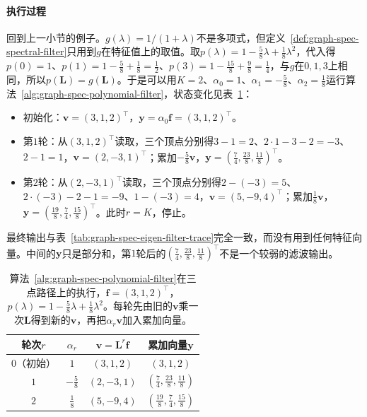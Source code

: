 \paragraph{执行过程}
回到上一小节的例子。$g(\lambda)=1/(1+\lambda)$不是多项式，但定义~\ref{def:graph-spec-spectral-filter}只用到$g$在特征值上的取值。取$p(\lambda)=1-\tfrac58\lambda+\tfrac18\lambda^2$，代入得$p(0)=1$、$p(1)=1-\tfrac58+\tfrac18=\tfrac12$、$p(3)=1-\tfrac{15}8+\tfrac98=\tfrac14$，与$g$在$0,1,3$上相同，所以$p(\bm L)=g(\bm L)$。于是可以用$K=2$、$\alpha_0=1$、$\alpha_1=-\tfrac58$、$\alpha_2=\tfrac18$运行算法~\ref{alg:graph-spec-polynomial-filter}，状态变化见表~\ref{tab:graph-spec-poly-filter-trace}：
\begin{itemize}
  \item 初始化：$\bm v=(3,1,2)^{\top}$，$\bm y=\alpha_0\bm f=(3,1,2)^{\top}$。
  \item 第$1$轮：从$(3,1,2)^{\top}$读取，三个顶点分别得$3-1=2$、$2\cdot1-3-2=-3$、$2-1=1$，$\bm v=(2,-3,1)^{\top}$；累加$-\tfrac58\bm v$，$\bm y=(\tfrac74,\tfrac{23}8,\tfrac{11}8)^{\top}$。
  \item 第$2$轮：从$(2,-3,1)^{\top}$读取，三个顶点分别得$2-(-3)=5$、$2\cdot(-3)-2-1=-9$、$1-(-3)=4$，$\bm v=(5,-9,4)^{\top}$；累加$\tfrac18\bm v$，$\bm y=(\tfrac{19}8,\tfrac74,\tfrac{15}8)^{\top}$。此时$r=K$，停止。
\end{itemize}
最终输出与表~\ref{tab:graph-spec-eigen-filter-trace}完全一致，而没有用到任何特征向量。中间的$\bm y$只是部分和，第$1$轮后的$(\tfrac74,\tfrac{23}8,\tfrac{11}8)^{\top}$不是一个较弱的滤波输出。

\begin{table}[!htb]
  \centering
  \caption{算法~\ref{alg:graph-spec-polynomial-filter}在三点路径上的执行，$\bm f=(3,1,2)^{\top}$，$p(\lambda)=1-\tfrac58\lambda+\tfrac18\lambda^2$。每轮先由旧的$\bm v$乘一次$\bm L$得到新的$\bm v$，再把$\alpha_r\bm v$加入累加向量。}
  \label{tab:graph-spec-poly-filter-trace}
  \small
  \begin{tabular}{@{}cccc@{}}
    \toprule
    轮次$r$ & $\alpha_r$ & $\bm v=\bm L^r\bm f$ & 累加向量$\bm y$ \\
    \midrule
    $0$（初始） & $1$ & $(3,1,2)$ & $(3,1,2)$ \\
    $1$ & $-\tfrac58$ & $(2,-3,1)$ & $(\tfrac74,\tfrac{23}8,\tfrac{11}8)$ \\
    $2$ & $\tfrac18$ & $(5,-9,4)$ & $(\tfrac{19}8,\tfrac74,\tfrac{15}8)$ \\
    \bottomrule
  \end{tabular}
\end{table}

